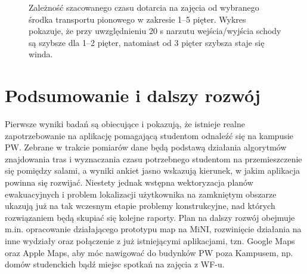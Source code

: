\documentclass[14pt,a4paper]{extarticle}
\begin{document}
\begin{figure}[H]
    \centering
    \caption{Zależność szacowanego czasu dotarcia na zajęcia od wybranego środka transportu pionowego w zakresie 1--5 pięter. Wykres pokazuje, że przy uwzględnieniu 20 s narzutu wejścia/wyjścia schody są szybsze dla 1--2 pięter, natomiast od 3 pięter szybsza staje się winda.}
    \label{fig:wykres-windy}
\end{figure}

\section{Podsumowanie i dalszy rozwój}

Pierwsze wyniki badań są obiecujące i pokazują, że istnieje realne zapotrzebowanie na aplikację pomagającą studentom odnaleźć się na kampusie PW. Zebrane w trakcie pomiarów dane będą podstawą działania algorytmów znajdowania tras i wyznaczania czasu potrzebnego studentom na przemieszczenie się pomiędzy salami, a wyniki ankiet jasno wskazują kierunek, w jakim aplikacja powinna się rozwijać. Niestety jednak wstępna wektoryzacja planów ewakuacyjnych i problem lokalizacji użytkownika na zamkniętym obszarze ukazują już na tak wczesnym etapie problemy konstrukcyjne, nad których rozwiązaniem będą skupiać się kolejne raporty. Plan na dalszy rozwój obejmuje m.in. opracowanie działającego prototypu map na MiNI, rozwinięcie działania na inne wydziały oraz połączenie z już istniejącymi aplikacjami, tzn. Google Maps oraz Apple Maps, aby móc nawigować do budynków PW poza Kampusem, np. domów studenckich bądź miejsc spotkań na zajęcia z WF-u.
\end{document}

